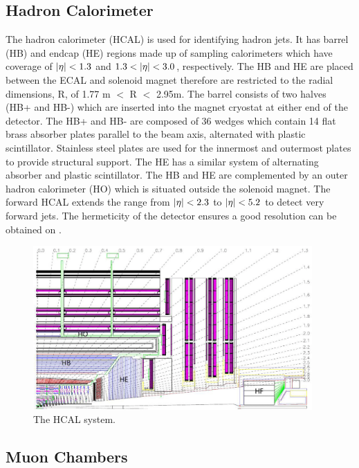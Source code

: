 \subsection{Hadron Calorimeter}

The hadron calorimeter (HCAL) is used for identifying hadron jets. It has barrel (HB) and endcap (HE) regions made up of sampling calorimeters which have coverage of $\lvert \eta \rvert<1.3$ and $1.3<\lvert \eta \rvert<3.0$, respectively. The HB and HE are placed between the ECAL and solenoid magnet therefore are restricted to the radial dimensions, R, of 1.77 m $<$ R $<$ 2.95m. The barrel consists of two halves (HB+ and HB-) which are inserted into the magnet cryostat at either end of the detector. The HB+ and HB- are composed of 36 wedges which contain 14 flat brass absorber plates parallel to the beam axis, alternated with plastic scintillator. Stainless steel plates are used for the innermost and outermost plates to provide structural support. The HE has a similar system of alternating absorber and plastic scintillator.
The HB and HE are complemented by an outer hadron calorimeter (HO) which is situated outside the solenoid magnet. The forward HCAL extends the range from $\lvert \eta \rvert<2.3$ to $\lvert \eta \rvert<5.2$ to detect very forward jets. The hermeticity of the detector ensures a good resolution can be obtained on \ETmiss.

\begin{figure}[ht!]
\centering
    \includegraphics[width=0.95\textwidth]{images/HCAL.png}
    \caption{The HCAL system.}
    \label{fig:hcal}
\end{figure}

\subsection{Muon Chambers}

